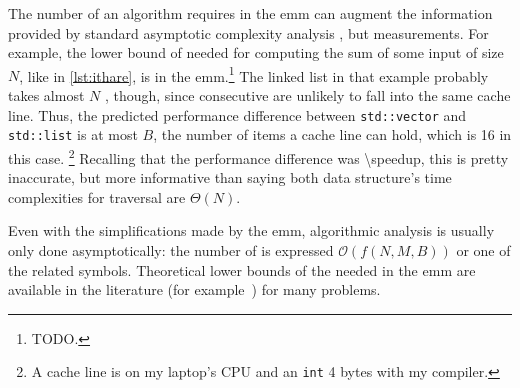 The number of  an algorithm requires in the \gls{emm} can augment the
information provided by standard asymptotic complexity analysis%
,
but  measurements.
For example, the lower bound of  needed for computing the sum of some
input of size \(N\), like in \cref{lst:ithare}, is
in the \gls{emm}.\footnote{%
  TODO.
}
The linked list in that example probably takes almost \(N\) ,
though, since consecutive  are unlikely to fall into the same cache
line.  Thus, the predicted performance difference between \texttt{std::vector}
and \texttt{std::list} is at most \(B\), the number of items a cache line can
hold, which is \si{16} in this case.%
\footnote{%
  A cache line is  on my laptop's CPU and an
  \texttt{int} \si{4} bytes with my compiler.
}
Recalling that the  performance difference was
\num[round-mode=places, round-precision=0]{\speedup}, this is pretty inaccurate, but more
informative than saying both  data structure's time complexities for
traversal are  \(\Theta(N)\).


Even with the simplifications made by the \gls{emm}, algorithmic analysis is usually only
done asymptotically: the number of  is expressed 
\(\mathcal{O}\left(f\left(N, M, B\right)\right)\) or one of the related symbols.
Theoretical lower bounds of the  needed in the \gls{emm} are available in
the literature (for example~\cite{afmh}) for many problems.



